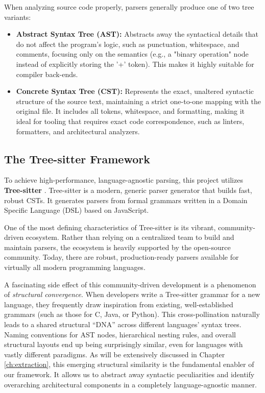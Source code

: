 When analyzing source code properly, parsers generally produce one of
two tree variants:
\begin{itemize}
  \item \textbf{Abstract Syntax Tree (AST):} Abstracts away the
    syntactical details that do not affect the program's logic, such
    as punctuation, whitespace, and comments, focusing only on the
    semantics (e.g., a "binary operation" node instead of explicitly
    storing the '+' token). This makes it highly suitable for
    compiler back-ends.
  \item \textbf{Concrete Syntax Tree (CST):} Represents the exact,
    unaltered syntactic structure of the source text, maintaining a
    strict one-to-one mapping with the original file. It includes all
    tokens, whitespace, and formatting, making it ideal for tooling
    that requires exact code correspondence, such as linters,
    formatters, and architectural analyzers.
\end{itemize}

\subsection{The Tree-sitter Framework}
To achieve high-performance, language-agnostic parsing, this project
utilizes \textbf{Tree-sitter} \cite{brunsfeld_treesitter_2018}.
Tree-sitter is a modern, generic parser generator that builds fast,
robust CSTs. It generates parsers from formal grammars written in a
Domain Specific Language (DSL) based on JavaScript.

One of the most defining characteristics of Tree-sitter is its vibrant,
community-driven ecosystem. Rather than relying on a centralized team
to build and maintain parsers, the ecosystem is heavily supported by
the open-source community. Today, there are robust, production-ready
parsers available for virtually all modern programming languages.

A fascinating side effect of this community-driven development is a
phenomenon of \textit{structural convergence}. When developers write a
Tree-sitter grammar for a new language, they frequently draw
inspiration from existing, well-established grammars (such as those
for C, Java, or Python). This cross-pollination naturally leads to a
shared structural ``DNA'' across different languages' syntax trees.
Naming conventions for AST nodes, hierarchical nesting rules, and
overall structural layouts end up being surprisingly similar, even for
languages with vastly different paradigms. As will be extensively
discussed in Chapter \ref{ch:extraction}, this emerging structural
similarity is the fundamental enabler of our framework. It allows us
to abstract away syntactic peculiarities and identify overarching
architectural components in a completely language-agnostic manner.

